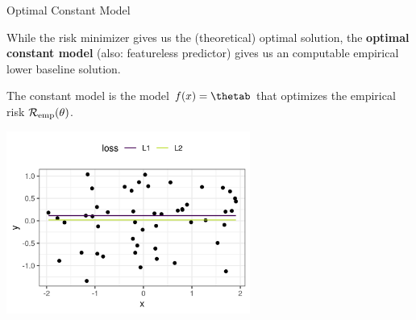 \begin{vbframe}{Optimal Constant Model}

While the risk minimizer gives us the (theoretical) optimal solution, the \textbf{optimal constant model} (also: featureless predictor) gives us an computable empirical lower baseline solution.

\vspace*{0.2cm}

The constant model is the model $\fx = \thetab$ that optimizes the empirical risk $\mathcal{R}_{\text{emp}}(\theta)$.

\vspace*{-0.5cm}

\begin{center}
	\includegraphics[width = 0.6\textwidth]{figure_man/l1_vs_l2.png}
\end{center}

\end{vbframe}

